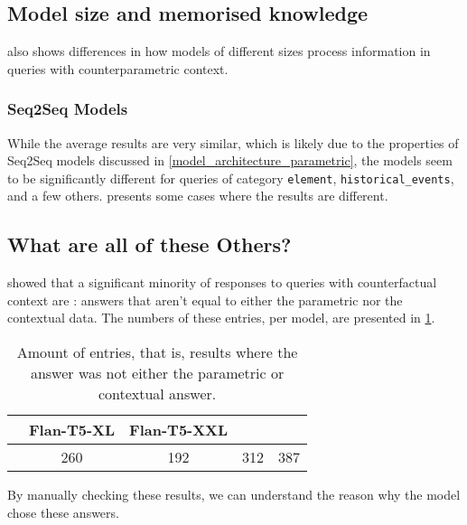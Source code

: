 \subsection{Model size and memorised knowledge}
\label{model_size_parametric}

 also shows differences in how models of different sizes process information in queries with counterparametric context.

\subsubsection{Seq2Seq Models}

While the average results are very similar, which is likely due to the properties of Seq2Seq models discussed in \cref{model_architecture_parametric}, the models seem to be significantly different for queries of category \texttt{element}, \texttt{historical\_events}, and a few others.
 presents some cases where the results are different.

\subsection{What are all of these Others?}

 showed that a significant minority of responses to queries with counterfactual context are \Other{}: answers that aren't equal to either the parametric nor the contextual data.
The numbers of these entries, per model, are presented in \cref{others_list}.

\begin{table}[h]
	\centering
	\footnotesize
	\begin{tabular}{>{\bfseries}l | c c c c}
		\toprule
			& \ttfamily\scriptsize Flan-T5-XL & \ttfamily\scriptsize Flan-T5-XXL & \ttfamily\scriptsize \llamaparbox{} & \ttfamily\scriptsize \bigllamaparbox{} \\
		\midrule
			\Other{} & 260 & 192 & 312 & 387 \\
		\bottomrule
	\end{tabular}
	\caption{Amount of \Other{} entries, that is, results where the answer was not either the parametric or contextual answer.}
	\label{others_list}
\end{table}

By manually checking these results, we can understand the reason why the model chose these answers.

